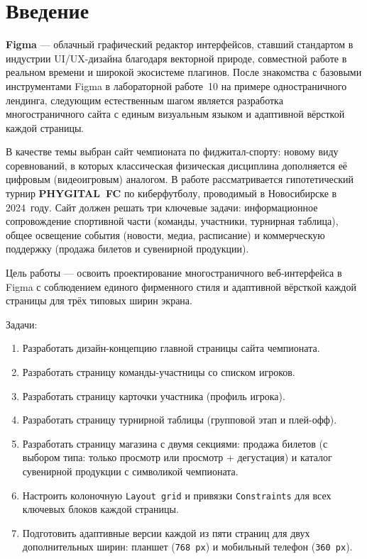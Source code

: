 \chapter*{Введение}
\label{ch:intro}

\textbf{Figma} — облачный графический редактор интерфейсов, ставший стандартом
в индустрии UI/UX-дизайна благодаря векторной природе, совместной работе в
реальном времени и широкой экосистеме плагинов. После знакомства с базовыми
инструментами Figma в лабораторной работе~10 на примере одностраничного
лендинга, следующим естественным шагом является разработка многостраничного
сайта с единым визуальным языком и адаптивной вёрсткой каждой страницы.

В качестве темы выбран сайт чемпионата по фиджитал-спорту: новому виду
соревнований, в которых классическая физическая дисциплина дополняется
её цифровым (видеоигровым) аналогом. В работе рассматривается
гипотетический турнир \textbf{PHYGITAL~FC} по киберфутболу, проводимый
в Новосибирске в 2024~году. Сайт должен решать три ключевые задачи:
информационное сопровождение спортивной части (команды, участники,
турнирная таблица), общее освещение события (новости, медиа, расписание)
и коммерческую поддержку (продажа билетов и сувенирной продукции).

Цель работы — освоить проектирование многостраничного веб-интерфейса в
Figma с соблюдением единого фирменного стиля и адаптивной вёрсткой каждой
страницы для трёх типовых ширин экрана.

Задачи:
\begin{enumerate}
  \item Разработать дизайн-концепцию главной страницы сайта чемпионата.
  \item Разработать страницу команды-участницы со списком игроков.
  \item Разработать страницу карточки участника (профиль игрока).
  \item Разработать страницу турнирной таблицы (групповой этап и
        плей-офф).
  \item Разработать страницу магазина с двумя секциями: продажа билетов
        (с выбором типа: только просмотр или просмотр + дегустация) и
        каталог сувенирной продукции с символикой чемпионата.
  \item Настроить колоночную \texttt{Layout grid} и привязки
        \texttt{Constraints} для всех ключевых блоков каждой страницы.
  \item Подготовить адаптивные версии каждой из пяти страниц для двух
        дополнительных ширин: планшет (\texttt{768\,px}) и мобильный
        телефон (\texttt{360\,px}).
\end{enumerate}

